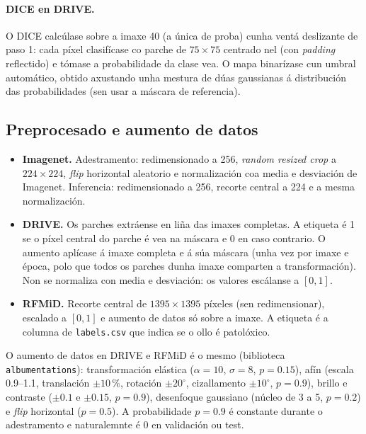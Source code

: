 \paragraph{DICE en DRIVE.} O DICE calcúlase sobre a imaxe 40 (a única de proba) cunha ventá deslizante de paso 1: cada píxel clasifícase co parche de $75\times 75$ centrado nel (con \emph{padding} reflectido) e tómase a probabilidade da clase vea. O mapa binarízase cun umbral automático, obtido axustando unha mestura de dúas gaussianas á distribución das probabilidades (sen usar a máscara de referencia).

\subsection{Preprocesado e aumento de datos}

\begin{itemize}
\item \textbf{Imagenet.} Adestramento: redimensionado a 256, \emph{random resized crop} a $224\times 224$, \emph{flip} horizontal aleatorio e normalización coa media e desviación de Imagenet. Inferencia: redimensionado a 256, recorte central a 224 e a mesma normalización.
\item \textbf{DRIVE.} Os parches extráense en liña das imaxes completas. A etiqueta é 1 se o píxel central do parche é vea na máscara e 0 en caso contrario. O aumento aplícase á imaxe completa e á súa máscara (unha vez por imaxe e época, polo que todos os parches dunha imaxe comparten a transformación). Non se normaliza con media e desviación: os valores escálanse a $[0,1]$.
\item \textbf{RFMiD.} Recorte central de $1395\times 1395$ píxeles (sen redimensionar), escalado a $[0,1]$ e aumento de datos só sobre a imaxe. A etiqueta é a columna de \texttt{labels.csv} que indica se o ollo é patolóxico.
\end{itemize}

O aumento de datos en DRIVE e RFMiD é o mesmo (biblioteca \texttt{albumentations}): transformación elástica ($\alpha=10$, $\sigma=8$, $p=0.15$), afín (escala 0.9--1.1, translación $\pm 10\,\%$, rotación $\pm 20^{\circ}$, cizallamento $\pm 10^{\circ}$, $p=0.9$), brillo e contraste ($\pm 0.1$ e $\pm 0.15$, $p=0.9$), desenfoque gaussiano (núcleo de 3 a 5, $p=0.2$) e \emph{flip} horizontal ($p=0.5$). A probabilidade $p=0.9$ é constante durante o adestramento e naturalemnte é 0 en validación ou test.
